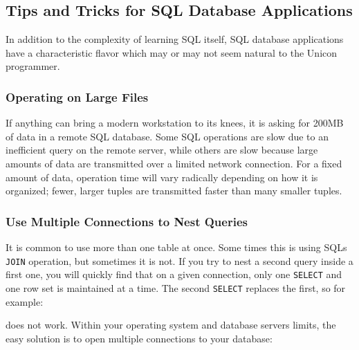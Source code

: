 \subsection{Tips and Tricks for SQL Database Applications}

In addition to the complexity of learning SQL itself, SQL database
applications have a characteristic flavor which may or may not seem
natural to the Unicon programmer.

\subsubsection{Operating on Large Files}

If anything can bring a modern workstation to its knees, it is asking
for 200MB of data in a remote SQL database. Some SQL operations are
slow due to an inefficient query on the remote server, while others are
slow because large amounts of data are transmitted over a limited
network connection. For a fixed amount of data, operation time will
vary radically depending on how it is organized; fewer, larger tuples
are transmitted faster than many smaller tuples.

\subsubsection{Use Multiple Connections to Nest Queries}

It is common to use more than one table at once. Some times this is
using SQL{\textquotesingle}s \texttt{JOIN} operation, but sometimes it
is not. If you try to nest a second query inside a first one, you will
quickly find that on a given connection, only one \texttt{SELECT} and
one row set is maintained at a time. The second \texttt{SELECT}
replaces the first, so for example:


\noindent
does not work. Within your operating system and database
server{\textquotesingle}s limits, the easy solution is to open multiple
connections to your database:

